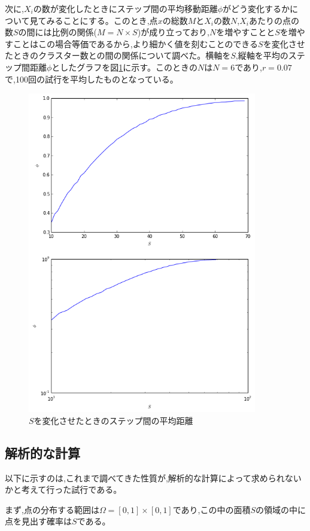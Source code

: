 次に,$X_{i}$の数が変化したときにステップ間の平均移動距離$\phi$がどう変化するかについて見てみることにする。このとき,点$x$の総数$M$と$X_{i}$の数$N$,$X_{i}$あたりの点の数$S$の間には比例の関係($M=N\times S$)が成り立っており,$N$を増やすことと$S$を増やすことはこの場合等価であるから,より細かく値を刻むことのできる$S$を変化させたときのクラスター数との間の関係について調べた。横軸を$S$,縦軸を平均のステップ間距離$\phi$としたグラフを図\ref{fig:f19}に示す。このときの$N$は$N=6$であり,$r=0.07$で,100回の試行を平均したものとなっている。
\begin{figure}[H]
    \begin{center}
        \includegraphics[width=10cm]{../img/S_phi_1.png}
        \caption{$S$を変化させたときのステップ間の平均距離}
        \label{fig:f19}
    \end{center}
\end{figure}

\subsection{解析的な計算}
以下に示すのは,これまで調べてきた性質が,解析的な計算によって求められないかと考えて行った試行である。

まず,点の分布する範囲は$\Omega = [0,1]\times [0,1]$であり,この中の面積$S$の領域の中に点を見出す確率は$S$である。

